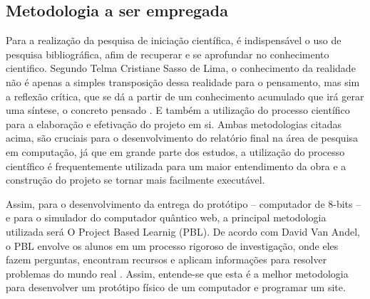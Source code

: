 \subsection{Metodologia a ser empregada}
Para a realização da pesquisa de iniciação científica, é indispensável o uso de pesquisa bibliográfica, afim de recuperar e se aprofundar no conhecimento cientifico. Segundo Telma Cristiane Sasso de Lima, o conhecimento da realidade não é apenas a simples transposição dessa realidade para o pensamento, mas sim a reflexão crítica, que se dá a partir de um conhecimento acumulado que irá gerar uma síntese, o concreto pensado \cite{1}. E também a utilização do processo científico para a elaboração e efetivação do projeto em si. Ambas metodologias citadas acima, são cruciais para o desenvolvimento do relatório final na área de pesquisa em computação, já que em grande parte dos estudos, a utilização do processo científico é frequentemente utilizada para um maior entendimento da obra e a construção do projeto se tornar mais facilmente executável.

Assim, para o desenvolvimento da entrega do protótipo – computador de 8-bits – e para o simulador do computador quântico web, a principal metodologia utilizada será O Project Based Learnig (PBL). De acordo com  David Van Andel, o PBL envolve os alunos em um processo rigoroso de investigação, onde eles fazem perguntas, encontram recursos e aplicam informações para resolver problemas do mundo real \cite{3}. Assim, entende-se que esta é a melhor metodologia para desenvolver um protótipo físico de um computador e programar um site.

\newpage
